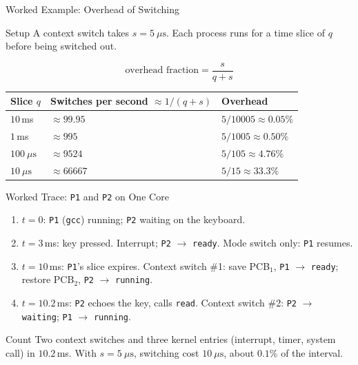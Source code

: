 \documentclass[aspectratio=169]{beamer}
\begin{document}
\begin{frame}{Worked Example: Overhead of Switching}
  \begin{exampleblock}{Setup}
    A context switch takes $s = 5\ \mu\text{s}$. Each process runs for a time
    slice of $q$ before being switched out.
  \end{exampleblock}
  \[
    \text{overhead fraction} = \frac{s}{q + s}
  \]
  \small
  \renewcommand{\arraystretch}{1.2}
  \begin{tabular}{@{}lll@{}}
    \textbf{Slice} $q$ & \textbf{Switches per second} $\approx 1/(q+s)$ & \textbf{Overhead} \\
    \hline
    $10$\,ms & $\approx 99.95$ & $5/10005 \approx 0.05\%$ \\
    $1$\,ms & $\approx 995$ & $5/1005 \approx 0.50\%$ \\
    $100\ \mu\text{s}$ & $\approx 9524$ & $5/105 \approx 4.76\%$ \\
    $10\ \mu\text{s}$ & $\approx 66667$ & $5/15 \approx 33.3\%$ \\
  \end{tabular}
  \vspace{0.15cm}

\end{frame}

\begin{frame}{Worked Trace: \texttt{P1} and \texttt{P2} on One Core}
  \begin{enumerate}
    \item $t=0$: \texttt{P1} (\texttt{gcc}) running; \texttt{P2} waiting on
      the keyboard.
    \item $t=3$\,ms: key pressed. Interrupt; \texttt{P2} $\to$ \texttt{ready}.
      Mode switch only: \texttt{P1} resumes.
    \item $t=10$\,ms: \texttt{P1}'s slice expires. Context switch
      \#1: save PCB$_1$, \texttt{P1} $\to$ \texttt{ready}; restore PCB$_2$,
      \texttt{P2} $\to$ \texttt{running}.
    \item $t=10.2$\,ms: \texttt{P2} echoes the key, calls \texttt{read}.
      Context switch \#2: \texttt{P2} $\to$ \texttt{waiting};
      \texttt{P1} $\to$ \texttt{running}.
  \end{enumerate}
  \vspace{0.15cm}
  \begin{exampleblock}{Count}
    Two context switches and three kernel entries (interrupt, timer, system
    call) in $10.2$\,ms. With $s = 5\ \mu\text{s}$, switching cost
    $10\ \mu\text{s}$, about $0.1\%$ of the interval.
  \end{exampleblock}
\end{frame}
\end{document}
